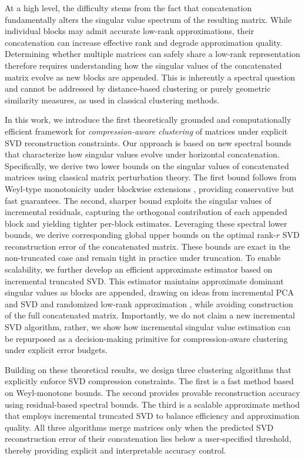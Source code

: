 \documentclass[10pt]{article} %
\begin{document}
At a high level, the difficulty stems from the fact that concatenation fundamentally alters the singular value spectrum of the resulting matrix.
While individual blocks may admit accurate low-rank approximations, their concatenation can increase effective rank and degrade approximation quality.
Determining whether multiple matrices can safely share a low-rank representation therefore requires understanding how the singular values of the concatenated matrix evolve as new blocks are appended.
This is inherently a spectral question and cannot be addressed by distance-based clustering or purely geometric similarity measures, as used in classical clustering methods.

In this work, we introduce the first theoretically grounded and computationally efficient framework for \emph{compression-aware clustering} of matrices under explicit SVD reconstruction constraints.
Our approach is based on new spectral bounds that characterize how singular values evolve under horizontal concatenation.
Specifically, we derive two lower bounds on the singular values of concatenated matrices using classical matrix perturbation theory.
The first bound follows from Weyl-type monotonicity under blockwise extensions \citep{weyl1912, stewart_sun1990}, providing conservative but fast guarantees.
The second, sharper bound exploits the singular values of incremental residuals, capturing the orthogonal contribution of each appended block and yielding tighter per-block estimates. Leveraging these spectral lower bounds, we derive corresponding global upper bounds on the optimal rank-$r$ SVD reconstruction error of the concatenated matrix.
These bounds are exact in the non-truncated case and remain tight in practice under truncation.
To enable scalability, we further develop an efficient approximate estimator based on incremental truncated SVD.
This estimator maintains approximate dominant singular values as blocks are appended, drawing on ideas from incremental PCA and SVD
\citep{hall1998incremental, levy2000sequential, brand2002incremental}
and randomized low-rank approximation
\citep{halko2011finding, tropp2017randomized},
while avoiding construction of the full concatenated matrix. Importantly, we do not claim a new incremental SVD algorithm, rather, we show how incremental singular value estimation can be repurposed as a decision-making primitive for compression-aware clustering under explicit error budgets. 

Building on these theoretical results, we design three clustering algorithms that explicitly enforce SVD compression constraints.
The first is a fast method based on Weyl-monotone bounds.
The second provides provable reconstruction accuracy using residual-based spectral bounds.
The third is a scalable approximate method that employs incremental truncated SVD to balance efficiency and approximation quality.
All three algorithms merge matrices only when the predicted SVD reconstruction error of their concatenation lies below a user-specified threshold, thereby providing explicit and interpretable accuracy control.
\end{document}
